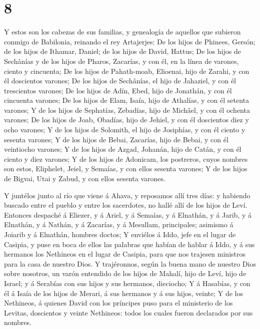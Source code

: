 \hypertarget{section-7}{%
\section{8}\label{section-7}}

 Y estos son los cabezas de sus familias, y genealogía de
aquellos que subieron conmigo de Babilonia, reinando el rey Artajerjes:
 De los hijos de Phinees, Gersón; de los hijos de Ithamar,
Daniel; de los hijos de David, Hattus;  De los hijos de
Sechânías y de los hijos de Pharos, Zacarías, y con él, en la línea de
varones, ciento y cincuenta;  De los hijos de Pahath-moab,
Elioenai, hijo de Zarahi, y con él doscientos varones;  De
los hijos de Sechânías, el hijo de Jahaziel, y con él trescientos
varones;  De los hijos de Adín, Ebed, hijo de Jonathán, y
con él cincuenta varones;  De los hijos de Elam, Isaía, hijo
de Athalías, y con él setenta varones;  Y de los hijos de
Sephatías, Zebadías, hijo de Michâel, y con él ochenta varones;
 De los hijos de Joab, Obadías, hijo de Jehiel, y con él
doscientos diez y ocho varones;  Y de los hijos de
Solomith, el hijo de Josiphías, y con él ciento y sesenta varones;
 Y de los hijos de Bebai, Zacarías, hijo de Bebai, y con él
veintiocho varones;  Y de los hijos de Azgad, Johanán, hijo
de Catán, y con él ciento y diez varones;  Y de los hijos
de Adonicam, los postreros, cuyos nombres son estos, Eliphelet, Jeiel, y
Semaías, y con ellos sesenta varones;  Y de los hijos de
Bigvai, Utai y Zabud, y con ellos sesenta varones.

 Y juntélos junto al río que viene á Ahava, y reposamos
allí tres días: y habiendo buscado entre el pueblo y entre los
sacerdotes, no hallé allí de los hijos de Leví.  Entonces
despaché á Eliezer, y á Ariel, y á Semaías, y á Elnathán, y á Jarib, y á
Elnathán, y á Nathán, y á Zacarías, y á Mesullam, principales; asimismo
á Joiarib y á Elnathán, hombres doctos;  Y enviélos á Iddo,
jefe en el lugar de Casipia, y puse en boca de ellos las palabras que
habían de hablar á Iddo, y á sus hermanos los Nethineos en el lugar de
Casipia, para que nos trajesen ministros para la casa de nuestro Dios.
 Y trajéronnos, según la buena mano de nuestro Dios sobre
nosotros, un varón entendido de los hijos de Mahalí, hijo de Leví, hijo
de Israel; y á Serabías con sus hijos y sus hermanos, dieciocho;
 Y á Hasabías, y con él á Isaía de los hijos de Merari, á
sus hermanos y á sus hijos, veinte;  Y de los Nethineos, á
quienes David con los príncipes puso para el ministerio de los Levitas,
doscientos y veinte Nethineos: todos los cuales fueron declarados por
sus nombres.

